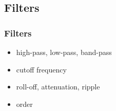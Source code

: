 
\subsection{Filters}

\begin{frame}
	\frametitle{Filters}
	\begin{itemize}
		\item high-pass, low-pass, band-pass
		\item cutoff frequency
		\item roll-off, attenuation, ripple
		\item order
	\end{itemize}
\end{frame}

